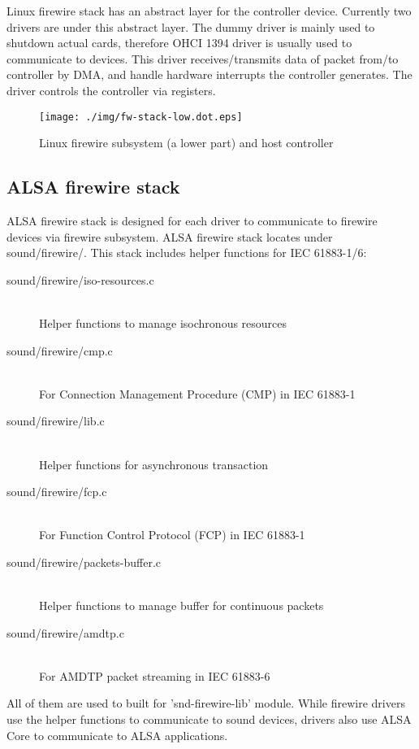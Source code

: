 \documentclass[onecolumn]{article}
\begin{document}
Linux firewire stack has an abstract layer for the controller device. Currently two drivers are under this abstract layer. The dummy driver is mainly used to shutdown actual cards, therefore OHCI 1394 driver is usually used to communicate to devices. This driver receives/transmits data of packet from/to controller by DMA, and handle hardware interrupts the controller generates. The driver controls the controller via registers.

\begin{figure}[htbp]
	\centering
	\texttt{[image: ./img/fw-stack-low.dot.eps]}
	\caption{{Linux firewire subsystem (a lower part) and host controller}}
	\label{fw-stack-low}
\end{figure}

\subsection{ALSA firewire stack}

ALSA firewire stack is designed for each driver to communicate to firewire devices via firewire subsystem. ALSA firewire stack locates under sound/firewire/. This stack includes helper functions for IEC 61883-1/6:

\begin{description}
\item[sound/firewire/iso-resources.c] \mbox{} \\
   Helper functions to manage isochronous resources
\item[sound/firewire/cmp.c] \mbox{} \\
   For Connection Management Procedure (CMP) in IEC 61883-1
\item[sound/firewire/lib.c] \mbox{} \\
   Helper functions for asynchronous transaction
\item[sound/firewire/fcp.c] \mbox{} \\
   For Function Control Protocol (FCP) in IEC 61883-1
\item[sound/firewire/packets-buffer.c] \mbox{} \\
   Helper functions to manage buffer for continuous packets
\item[sound/firewire/amdtp.c] \mbox{} \\
   For AMDTP packet streaming in IEC 61883-6
\end{description}

All of them are used to built for 'snd-firewire-lib' module. While firewire drivers use the helper functions to communicate to sound devices, drivers also use ALSA Core to communicate to ALSA applications.
\end{document}

